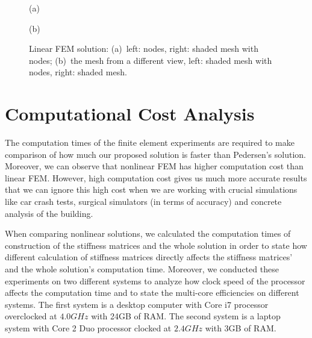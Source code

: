\begin{figure}[h]
\centerline{}
\centerline{(a)}
\centerline{}
\centerline{(b)}
\caption{Linear FEM solution: (a)~left: nodes, right: shaded mesh with nodes; (b)~the mesh from a different view, left: shaded mesh with nodes, right: shaded mesh.}
\label{fig:fig40_41}
\end{figure}


\section{Computational Cost Analysis}

The computation times of the finite element experiments are required to make comparison of how much our proposed solution is faster than Pedersen's solution. Moreover, we can observe that nonlinear FEM has higher computation cost than linear FEM. However, high computation cost gives us much more accurate results that we can ignore this high cost when we are working with crucial simulations like car crash tests, surgical simulators (in terms of accuracy) and concrete analysis of the building.

When comparing nonlinear solutions, we calculated the computation times of construction of the stiffness matrices and the whole solution in order to state how different calculation of stiffness matrices directly affects the stiffness matrices' and the whole solution's computation time. Moreover, we conducted these experiments on two different systems to analyze how clock speed of the processor affects the computation time and to state the multi-core efficiencies on different systems. The first system is a desktop computer with Core i7 processor overclocked at $4.0GHz$ with 24GB of RAM. The second system is a laptop system with Core 2 Duo processor clocked at $2.4GHz$ with 3GB of RAM.

